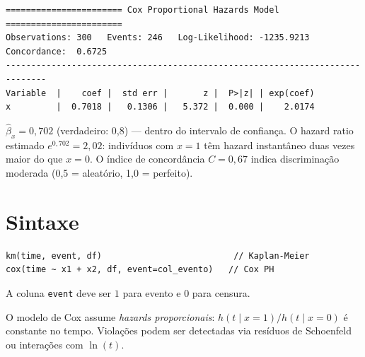 \begin{lstlisting}[language={}, basicstyle=\ttfamily\small,
  frame=none, numbers=none, backgroundcolor=\color{codbg},
  xleftmargin=0pt, xrightmargin=0pt, breaklines=false]
======================= Cox Proportional Hazards Model =======================
Observations: 300   Events: 246   Log-Likelihood: -1235.9213
Concordance:  0.6725
------------------------------------------------------------------------------
Variable  |    coef |  std err |       z |  P>|z| | exp(coef)
x         |  0.7018 |   0.1306 |   5.372 |  0.000 |    2.0174
\end{lstlisting}

$\hat\beta_x = 0{,}702$ (verdadeiro: 0{,}8) — dentro do intervalo de confiança.
O hazard ratio estimado $e^{0{,}702} = 2{,}02$: indivíduos com $x=1$ têm
hazard instantâneo duas vezes maior do que $x=0$. O índice de concordância
$C = 0{,}67$ indica discriminação moderada (0{,}5 = aleatório, 1{,}0 = perfeito).

\section{Sintaxe}

\begin{lstlisting}
km(time, event, df)                          // Kaplan-Meier
cox(time ~ x1 + x2, df, event=col_evento)   // Cox PH
\end{lstlisting}

A coluna \lstinline{event} deve ser $1$ para evento e $0$ para censura.

\begin{nota}
  O modelo de Cox assume \emph{hazards proporcionais}: $h(t \mid x=1)/h(t \mid x=0)$
  é constante no tempo. Violações podem ser detectadas via resíduos de
  Schoenfeld ou interações com $\ln(t)$.
\end{nota}
